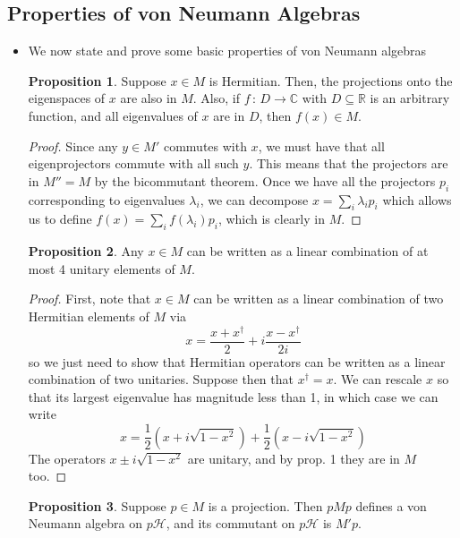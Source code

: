 \documentclass[12pt,a4paper]{article}
\numberwithin{equation}{section}
\theoremstyle{definition}
\theoremstyle{theorem}
\newtheorem{proposition}{Proposition}
\begin{document}
	\subsection{Properties of von Neumann Algebras}
	\begin{itemize}
		\item We now state and prove some basic properties of von Neumann algebras
		\begin{proposition}
			Suppose $x\in M$ is Hermitian. Then, the projections onto the eigenspaces of $x$ are also in $M$. Also, if $f\,:\,D\to \mathbb{C}$ with $D\subseteq \mathbb{R}$ is an arbitrary function, and all eigenvalues of $x$ are in $D$, then $f(x)\in M$.
		\end{proposition}
		\begin{proof}
			Since any $y\in M'$ commutes with $x$, we must have that all eigenprojectors commute with all such $y$. This means that the projectors are in $M''= M$ by the bicommutant theorem. Once we have all the projectors $p_{i}$ corresponding to eigenvalues $\lambda_{i}$, we can decompose $x=\sum_{i}\lambda_{i}p_{i}$ which allows us to define $f(x)=\sum_{i}f(\lambda_{i})p_{i}$, which is clearly in $M$. 
		\end{proof}
		\begin{proposition}
			Any $x\in M$ can be written as a linear combination of at most 4 unitary elements of $M$.
		\end{proposition}
		\begin{proof}
			First, note that $x\in M$ can be written as a linear combination of two Hermitian elements of $M$ via
			\begin{equation}
				x=\frac{x+x^{\dagger}}{2}+i\frac{x-x^{\dagger}}{2i}
			\end{equation}
			so we just need to show that Hermitian operators can be written as a linear combination of two unitaries. Suppose then that $x^{\dagger}=x$. We can rescale $x$ so that its largest eigenvalue has magnitude less than 1, in which case we can write
			\begin{equation}
				x=\frac{1}{2}\left(x+i\sqrt{1-x^{2}}\right)+\frac{1}{2}\left(x-i\sqrt{1-x^{2}}\right)
			\end{equation}
			The operators $x\pm i\sqrt{1-x^{2}}$ are unitary, and by prop. 1 they are in $M$ too. 
		\end{proof}
		\begin{proposition}
			Suppose $p\in M$ is a projection. Then $pMp$ defines a von Neumann algebra on $p\mathcal{H}$, and its commutant on $p\mathcal{H}$ is $M'p$.

\end{proposition}
\end{itemize}
\end{document}
